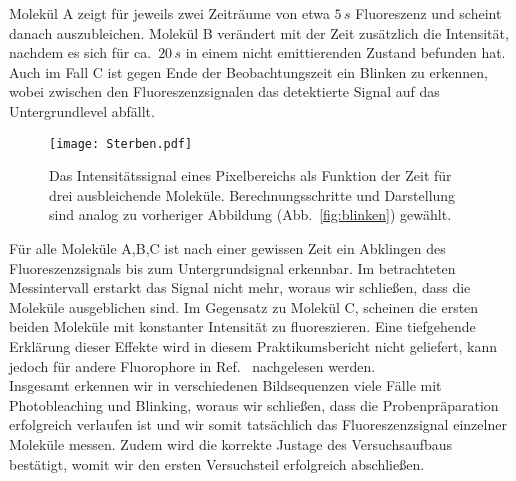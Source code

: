 Molekül A zeigt für jeweils zwei Zeiträume von etwa $5\,\si{s}$ Fluoreszenz und scheint danach 
auszubleichen. Molekül B verändert mit der Zeit zusätzlich die Intensität, nachdem 
es sich für ca.~$20\,\si{s}$ in einem nicht emittierenden Zustand befunden hat.
Auch im Fall C ist gegen Ende der Beobachtungszeit ein Blinken zu erkennen, wobei zwischen 
den Fluoreszenzsignalen das detektierte Signal auf das Untergrundlevel abfällt.  
\begin{figure}[h!]
    \centering
    \texttt{[image: Sterben.pdf]}
    \caption{\label{fig:sterben}Das Intensitätssignal eines Pixelbereichs als Funktion
    der Zeit für drei ausbleichende Moleküle. Berechnungsschritte und Darstellung sind 
    analog zu vorheriger Abbildung (Abb.~\ref{fig:blinken}) gewählt.}
\end{figure}\FloatBarrier
Für alle Moleküle A,B,C ist nach einer gewissen Zeit ein Abklingen des Fluoreszenzsignals 
bis zum Untergrundsignal erkennbar. Im betrachteten Messintervall erstarkt das Signal 
nicht mehr, woraus wir schließen, dass die Moleküle ausgeblichen sind. 
Im Gegensatz zu Molekül C, scheinen die ersten beiden Moleküle mit konstanter Intensität
zu fluoreszieren. Eine tiefgehende Erklärung dieser Effekte wird in diesem Praktikumsbericht 
nicht geliefert, kann jedoch für andere Fluorophore in Ref.~\cite{fluo} nachgelesen werden.\\
Insgesamt erkennen wir in verschiedenen Bildsequenzen viele Fälle mit 
Photobleaching und Blinking, woraus wir schließen, dass die 
Probenpräparation erfolgreich verlaufen ist und wir somit tatsächlich 
das Fluoreszenzsignal einzelner Moleküle messen. Zudem wird die korrekte 
Justage des Versuchsaufbaus bestätigt, womit wir den ersten Versuchsteil 
erfolgreich abschließen. \\

